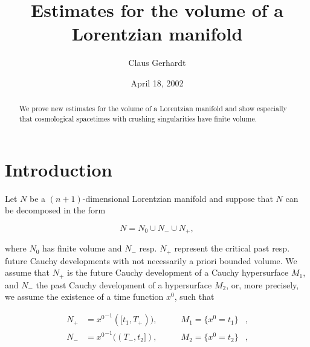 \documentclass[ a4paper, oneside]{amsart}
\newcommand{\uu}{\cup}
\newcommand{\qq}{\qquad}
\newcommand\nd{\noindent}
\newcommand\cvm{\vspace\Cmedskipamount}
\newcommand\cvb{\vspace\Cbigskipamount}
\newcommand{\lae}[1]{\label{E:#1}}
\theoremstyle{plain}
\theoremstyle{definition}
\theoremstyle{remark}
\numberwithin{equation}{section}
\begin{document}
\lipsum[2-$paragraph]
\title{Estimates for the volume of a Lorentzian manifold}

\author{Claus Gerhardt}
\address{Ruprecht-Karls-Universit\"at, Institut f\"ur Angewandte Mathematik,
Im Neuenheimer Feld 294, 69120 Heidelberg, Germany}

%
\date{April 18, 2002}
%


\begin{abstract} We prove new estimates for the volume of a Lorentzian
mani\-fold and show especially that cosmological spacetimes with crushing
singularities have finite volume.
\end{abstract}
\maketitle
\thispagestyle{empty}

\setcounter{section}{-1}
\section{Introduction} 

\cvb
Let $N$ be a  $(n+1)$-dimensional Lorentzian manifold and suppose that $N$ can be
decomposed in the form

\begin{equation}\lae{0.1}
N=N_0\uu N_-\uu N_+,
\end{equation}

\cvm 
\nd where $N_0$ has finite volume and $N_-$ resp. $N_+$ represent the critical
past resp. future Cauchy developments with not necessarily a priori bounded
volume. We assume that $N_+$ is the future Cauchy development of a Cauchy
hypersurface $M_1$, and $N_-$ the past Cauchy development of a hypersurface
$M_2$, or, more precisely, we assume the existence of a time function $x^0$,
such that

\begin{equation}
\begin{aligned}
N_+&={x^0}^{-1}([t_1,T_+)),&\qq M_1=\{x^0=t_1\}&,\\
N_-&={x^0}^{-1}((T_-,t_2]),&\qq M_2=\{x^0=t_2\}&,
\end{aligned}
\end{equation}
\end{document}
